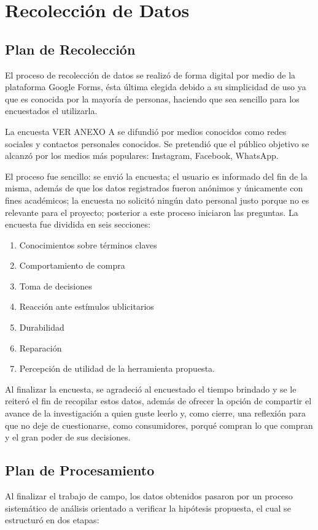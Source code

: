\section{Recolección de Datos}

\subsection{Plan de Recolección}

El proceso de recolección de datos se realizó de forma digital por medio de
la plataforma Google Forms, ésta última elegida debido a su simplicidad de uso
ya que es conocida por la mayoría de personas, haciendo que sea sencillo para
los encuestados el utilizarla. 

La encuesta VER ANEXO A se difundió por medios conocidos como redes sociales y contactos
personales conocidos. Se pretendió que el público objetivo se alcanzó por los
medios más populares: Instagram, Facebook, WhatsApp. 

El proceso fue sencillo: se envió la encuesta; el usuario es informado del fin de
la misma, además de que los datos registrados fueron anónimos y únicamente con
fines académicos; la encuesta no solicitó ningún dato personal justo porque no
es relevante para el proyecto; posterior a este proceso iniciaron las preguntas.
La encuesta fue dividida en seis secciones:
\begin{enumerate}
    \item Conocimientos sobre términos claves
    \item Comportamiento de compra
    \item Toma de decisiones
    \item Reacción ante estímulos ublicitarios
    \item Durabilidad
    \item Reparación
    \item Percepción de utilidad de la herramienta propuesta.
\end{enumerate}

Al finalizar la encuesta, se agradeció al encuestado el tiempo brindado y se le
reiteró el fin de recopilar estos datos, además de ofrecer la opción de
compartir el avance de la investigación a quien guste leerlo y, como cierre, una
reflexión para que no deje de cuestionarse, como consumidores, porqué compran lo
que compran y el gran poder de sus decisiones. 

\subsection{Plan de Procesamiento}
Al finalizar el trabajo de campo, los datos obtenidos pasaron por un proceso
sistemático de análisis orientado a verificar la hipótesis propuesta, el cual se
estructuró en dos etapas:

